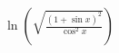 \documentclass[preview]{standalone}
\begin{document}
\begin{align*}
\ln \left( \sqrt{\frac{(1 + \sin{x})^2}{\cos^2{x}}} \right)
\end{align*}
\end{document}
